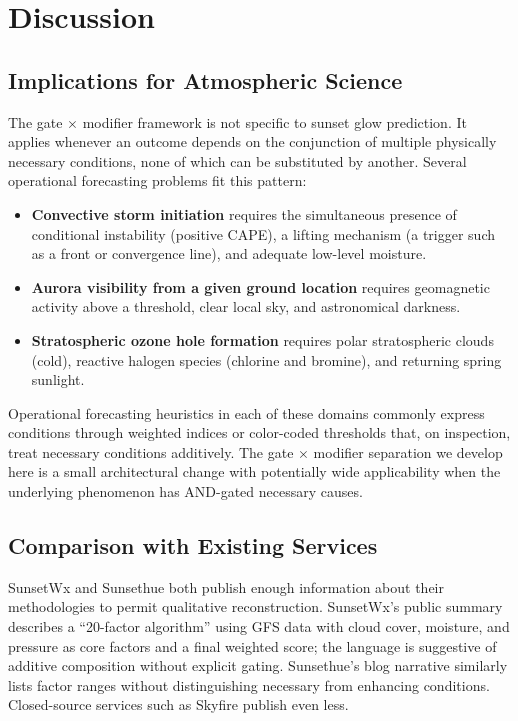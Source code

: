 \documentclass[11pt,a4paper]{article}
\begin{document}
\section{Discussion}
\label{sec:discussion}

\subsection{Implications for Atmospheric Science}

The gate $\times$ modifier framework is not specific to sunset glow prediction. It applies whenever an outcome depends on the conjunction of multiple physically necessary conditions, none of which can be substituted by another. Several operational forecasting problems fit this pattern:
\begin{itemize}
\item \textbf{Convective storm initiation} requires the simultaneous presence of conditional instability (positive CAPE), a lifting mechanism (a trigger such as a front or convergence line), and adequate low-level moisture.
\item \textbf{Aurora visibility from a given ground location} requires geomagnetic activity above a threshold, clear local sky, and astronomical darkness.
\item \textbf{Stratospheric ozone hole formation} requires polar stratospheric clouds (cold), reactive halogen species (chlorine and bromine), and returning spring sunlight.
\end{itemize}
Operational forecasting heuristics in each of these domains commonly express conditions through weighted indices or color-coded thresholds that, on inspection, treat necessary conditions additively. The gate $\times$ modifier separation we develop here is a small architectural change with potentially wide applicability when the underlying phenomenon has AND-gated necessary causes.

\subsection{Comparison with Existing Services}

SunsetWx and Sunsethue both publish enough information about their methodologies to permit qualitative reconstruction. SunsetWx's public summary \citep{forecastingbeauty2015} describes a ``20-factor algorithm'' using GFS data with cloud cover, moisture, and pressure as core factors and a final weighted score; the language is suggestive of additive composition without explicit gating. Sunsethue's blog narrative similarly lists factor ranges without distinguishing necessary from enhancing conditions. Closed-source services such as Skyfire publish even less.
\end{document}
